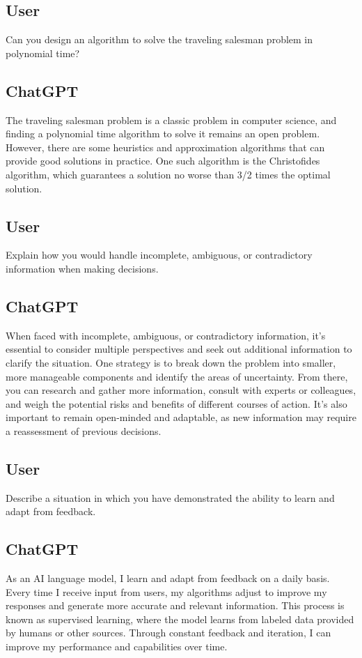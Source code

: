 \documentclass{article}
\begin{document}
\subsection*{User}
Can you design an algorithm to solve the traveling salesman problem in polynomial time?

\subsection*{ChatGPT}
The traveling salesman problem is a classic problem in computer science, and finding a polynomial time algorithm to solve it remains an open problem. However, there are some heuristics and approximation algorithms that can provide good solutions in practice. One such algorithm is the Christofides algorithm, which guarantees a solution no worse than 3/2 times the optimal solution.

\subsection*{User}
Explain how you would handle incomplete, ambiguous, or contradictory information when making decisions.

\subsection*{ChatGPT}
When faced with incomplete, ambiguous, or contradictory information, it's essential to consider multiple perspectives and seek out additional information to clarify the situation. One strategy is to break down the problem into smaller, more manageable components and identify the areas of uncertainty. From there, you can research and gather more information, consult with experts or colleagues, and weigh the potential risks and benefits of different courses of action. It's also important to remain open-minded and adaptable, as new information may require a reassessment of previous decisions.

\subsection*{User}
Describe a situation in which you have demonstrated the ability to learn and adapt from feedback.

\subsection*{ChatGPT}
As an AI language model, I learn and adapt from feedback on a daily basis. Every time I receive input from users, my algorithms adjust to improve my responses and generate more accurate and relevant information. This process is known as supervised learning, where the model learns from labeled data provided by humans or other sources. Through constant feedback and iteration, I can improve my performance and capabilities over time.
\end{document}
